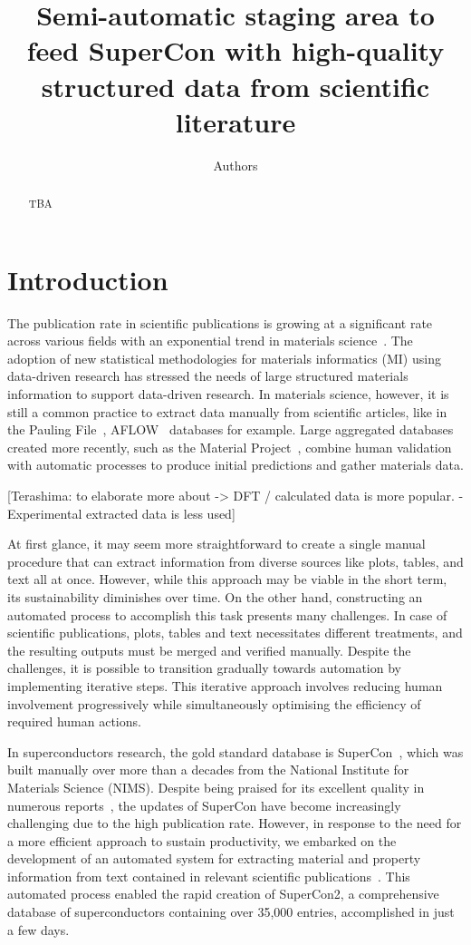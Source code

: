 \documentclass[a4paper]{article}
\title{Semi-automatic staging area to feed SuperCon with high-quality structured data from scientific literature}
\author[1]{Authors}
\begin{document}
\maketitle

\begin{abstract}
    TBA
\end{abstract}

\section{Introduction}
The publication rate in scientific publications is growing at a significant rate across various fields with an exponential trend in materials science~\cite{Pratheepan_2019}. 
The adoption of new statistical methodologies for materials informatics (MI) using data-driven research has stressed the needs of large structured materials information to support data-driven research. 
In materials science, however, it is still a common practice to extract data manually from scientific articles, like in the Pauling File~\cite{Blokhin2018ThePF_paulingFile}, AFLOW~\cite{aflowcurtarolo2012aflow} databases for example. 
Large aggregated databases created more recently, such as the Material Project~\cite{materialsprojectJain2013}, combine human validation with automatic processes to produce initial predictions and gather materials data. 

[Terashima: to elaborate more about -> DFT / calculated data is more popular. - Experimental extracted data is less used]

At first glance, it may seem more straightforward to create a single manual procedure that can extract information from diverse sources like plots, tables, and text all at once. However, while this approach may be viable in the short term, its sustainability diminishes over time. 
On the other hand, constructing an automated process to accomplish this task presents many challenges. In case of scientific publications, plots, tables and text necessitates different treatments, and the resulting outputs must be merged and verified manually. Despite the challenges, it is possible to transition gradually towards automation by implementing iterative steps. This iterative approach involves reducing human involvement progressively while simultaneously optimising the efficiency of required human actions. 

In superconductors research, the gold standard database is SuperCon~\cite{SuperCon}, which was built manually over more than a decades from the National Institute for Materials Science (NIMS). 
Despite being praised for its excellent quality in numerous reports~\cite{roter2020predicting, stanev_machine_2017, tran2022machine, konno2021deep}, the updates of SuperCon have become increasingly challenging due to the high publication rate. However, in response to the need for a more efficient approach to sustain productivity, we embarked on the development of an automated system for extracting material and property information from text contained in relevant scientific publications~\cite{lfoppiano2023automatic}. This automated process enabled the rapid creation of SuperCon2, a comprehensive database of superconductors containing over 35,000 entries, accomplished in just a few days. 
\end{document}

